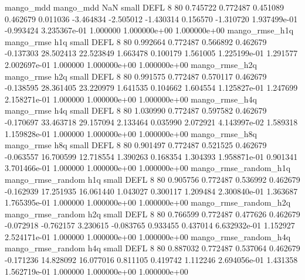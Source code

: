             mango_mdd         mango_mdd                  NaN      small     DEFL                 8 80 0.745722       0.772487 0.451089       0.462679    0.011036     -3.464834     -2.505012    -1.430314       0.156570 -1.310720 1.937499e-01    -0.993424   3.235367e-01            1.000000    1.000000e+00        1.000000e+00
       mango_rmse_h1q        mango_rmse                  h1q      small     DEFL                 8 80 0.992664       0.772487 0.566892       0.462679   -0.137303     28.502413     22.523849     1.663478       0.100179  1.561005 1.225199e-01     1.291577   2.002697e-01            1.000000    1.000000e+00        1.000000e+00
       mango_rmse_h2q        mango_rmse                  h2q      small     DEFL                 8 80 0.991575       0.772487 0.570117       0.462679   -0.138595     28.361405     23.220979     1.641535       0.104662  1.604554 1.125827e-01     1.247699   2.158271e-01            1.000000    1.000000e+00        1.000000e+00
       mango_rmse_h4q        mango_rmse                  h4q      small     DEFL                 8 80 1.030990       0.772487 0.597582       0.462679   -0.170697     33.463718     29.157094     2.133464       0.035990  2.072921 4.143997e-02     1.589318   1.159828e-01            1.000000    1.000000e+00        1.000000e+00
       mango_rmse_h8q        mango_rmse                  h8q      small     DEFL                 8 80 0.901497       0.772487 0.521525       0.462679   -0.063557     16.700599     12.718554     1.390263       0.168354  1.304393 1.958871e-01     0.901341   3.701466e-01            1.000000    1.000000e+00        1.000000e+00
mango_rmse_random_h1q mango_rmse_random                  h1q      small     DEFL                 8 80 0.905756       0.772487 0.536992       0.462679   -0.162939     17.251935     16.061440     1.043027       0.300117  1.209484 2.300840e-01     1.363687   1.765395e-01            1.000000    1.000000e+00        1.000000e+00
mango_rmse_random_h2q mango_rmse_random                  h2q      small     DEFL                 8 80 0.766599       0.772487 0.477626       0.462679   -0.072918     -0.762157      3.230615    -0.083765       0.933455  0.437014 6.632932e-01     1.152927   2.524171e-01            1.000000    1.000000e+00        1.000000e+00
mango_rmse_random_h4q mango_rmse_random                  h4q      small     DEFL                 8 80 0.887032       0.772487 0.537064       0.462679   -0.171236     14.828092     16.077016     0.811105       0.419742  1.112246 2.694056e-01     1.431358   1.562719e-01            1.000000    1.000000e+00        1.000000e+00
